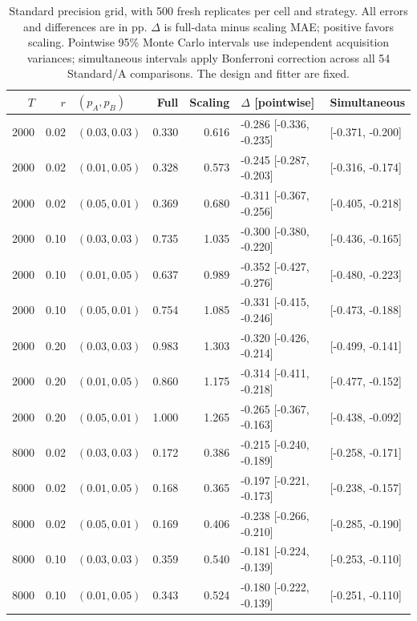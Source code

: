 \begin{table}[!htbp]
\centering
\small\setlength{\tabcolsep}{4pt}
\caption{Standard precision grid, with 500 fresh replicates per cell and strategy. All errors and differences are in pp. $\Delta$ is full-data minus scaling MAE; positive favors scaling. Pointwise 95\% Monte Carlo intervals use independent acquisition variances; simultaneous intervals apply Bonferroni correction across all 54 Standard/A comparisons. The design and fitter are fixed.}
\label{tab:precisionprimary}
\begin{tabular}{@{}rrlrrll@{}}
\toprule
$T$ & $r$ & $(p_A,p_B)$ & Full & Scaling & $\Delta$ [pointwise] & Simultaneous \\
\midrule
2000 & 0.02 & $(0.03,0.03)$ & 0.330 & 0.616 & -0.286 [-0.336, -0.235] & [-0.371, -0.200] \\
2000 & 0.02 & $(0.01,0.05)$ & 0.328 & 0.573 & -0.245 [-0.287, -0.203] & [-0.316, -0.174] \\
2000 & 0.02 & $(0.05,0.01)$ & 0.369 & 0.680 & -0.311 [-0.367, -0.256] & [-0.405, -0.218] \\
2000 & 0.10 & $(0.03,0.03)$ & 0.735 & 1.035 & -0.300 [-0.380, -0.220] & [-0.436, -0.165] \\
2000 & 0.10 & $(0.01,0.05)$ & 0.637 & 0.989 & -0.352 [-0.427, -0.276] & [-0.480, -0.223] \\
2000 & 0.10 & $(0.05,0.01)$ & 0.754 & 1.085 & -0.331 [-0.415, -0.246] & [-0.473, -0.188] \\
2000 & 0.20 & $(0.03,0.03)$ & 0.983 & 1.303 & -0.320 [-0.426, -0.214] & [-0.499, -0.141] \\
2000 & 0.20 & $(0.01,0.05)$ & 0.860 & 1.175 & -0.314 [-0.411, -0.218] & [-0.477, -0.152] \\
2000 & 0.20 & $(0.05,0.01)$ & 1.000 & 1.265 & -0.265 [-0.367, -0.163] & [-0.438, -0.092] \\
8000 & 0.02 & $(0.03,0.03)$ & 0.172 & 0.386 & -0.215 [-0.240, -0.189] & [-0.258, -0.171] \\
8000 & 0.02 & $(0.01,0.05)$ & 0.168 & 0.365 & -0.197 [-0.221, -0.173] & [-0.238, -0.157] \\
8000 & 0.02 & $(0.05,0.01)$ & 0.169 & 0.406 & -0.238 [-0.266, -0.210] & [-0.285, -0.190] \\
8000 & 0.10 & $(0.03,0.03)$ & 0.359 & 0.540 & -0.181 [-0.224, -0.139] & [-0.253, -0.110] \\
8000 & 0.10 & $(0.01,0.05)$ & 0.343 & 0.524 & -0.180 [-0.222, -0.139] & [-0.251, -0.110] \\

\end{tabular}
\end{table}
